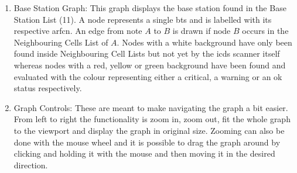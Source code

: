 \begin{enumerate}
\item Base Station Graph: This graph displays the base station found in the Base Station List (11).
A node represents a single \gls{bts} and is labelled with its respective \gls{arfcn}.
An edge from note $A$ to $B$ is drawn if node $B$ occurs in the Neighbouring Cells List of $A$.
Nodes with a white background have only been found inside Neighbouring Cell Lists but not yet by the \gls{icds} scanner itself whereas nodes with a red, yellow or green background have been found and evaluated with the colour representing either a critical, a warning or an ok status respectively.

\item Graph Controls: These are meant to make navigating the graph a bit easier.
From left to right the functionality is zoom in, zoom out, fit the whole graph to the viewport and display the graph in original size.
Zooming can also be done with the mouse wheel and it is possible to drag the graph around by clicking and holding it with the mouse and then moving it in the desired direction.
\end{enumerate}
